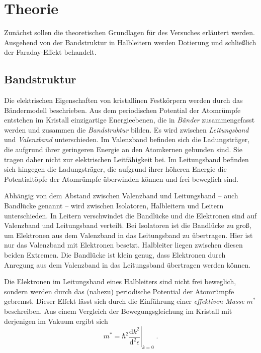 \section{Theorie}
\label{sec:theorie}
Zunächst sollen die theoretischen Grundlagen für des Versuches erläutert werden.
Ausgehend von der Bandstruktur in Halbleitern werden Dotierung und schließlich der Faraday-Effekt behandelt.



\subsection{Bandstruktur}
Die elektrischen Eigenschaften von kristallinen Festkörpern werden durch das Bändermodell beschrieben.
Aus dem periodischen Potential der Atomrümpfe entstehen im Kristall einzigartige Energieebenen,
die in \emph{Bänder} zusammengefasst werden und zusammen die \emph{Bandstruktur} bilden.
Es wird zwischen \emph{Leitungsband} und \emph{Valenzband} unterschieden.
    Im Valenzband befinden sich die Ladungsträger, die aufgrund ihrer geringeren Energie an den Atomkernen gebunden sind.
    Sie tragen daher nicht zur elektrischen Leitfähigkeit bei.
    Im Leitungsband befinden sich hingegen die Ladungsträger,
    die aufgrund ihrer höheren Energie die Potentialtöpfe der Atomrümpfe überwinden können und frei beweglich sind.

Abhängig von dem Abstand zwischen Valenzband und Leitungsband – auch Bandlücke genannt – wird zwischen Isolatoren, Halbleitern und Leitern unterschieden.
    In Leitern verschwindet die Bandlücke und die Elektronen sind auf Valenzband und Leitungsband verteilt.
    Bei Isolatoren ist die Bandlücke zu groß, um Elektronen aus dem Valenzband in das Leitungsband zu übertragen.
    Hier ist nur das Valenzband mit Elektronen besetzt.
    Halbleiter liegen zwischen diesen beiden Extremen.
    Die Bandlücke ist klein genug, dass Elektronen durch Anregung aus dem Valenzband in das Leitungsband übertragen werden können.


Die Elektronen im Leitungsband eines Halbleiters sind nicht frei beweglich,
sondern werden durch das (nahezu) periodische Potential der Atomrümpfe gebremst.
Dieser Effekt lässt sich durch die Einführung einer \emph{effektiven Masse} $m^*$ beschreiben.
Aus einem Vergleich der Bewegungsgleichung im Kristall mit derjenigen im Vakuum ergibt sich
\begin{equation*}
    m^* = \hbar^2 \left. \frac{\mathrm{d} k^2}{\mathrm{d}^2 \epsilon} \right\rvert_{k=0}
    \; .
\end{equation*}


